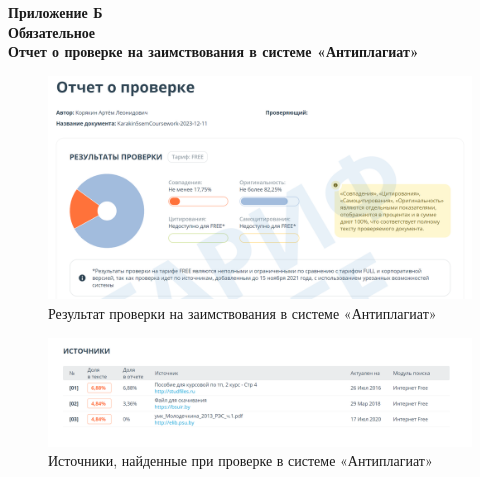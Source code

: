 \begin{center}
\textbf{Приложение Б}\\
\textbf{Обязательное}\\
\textbf{Отчет о проверке на заимствования в системе «Антиплагиат»}

\begin{figure}[h]
  \centering
  \includegraphics[scale = 0.5]{images2/antiplagiat01.png}
  \caption{
    Результат проверки на заимствования в системе «Антиплагиат»}
\end{figure}

\begin{figure}[h]
  \centering
  \includegraphics[scale = 0.5]{images2/antiplagiat02.png}
  \caption{ Источники, найденные при проверке в системе «Антиплагиат»}
\end{figure}


\end{center}
